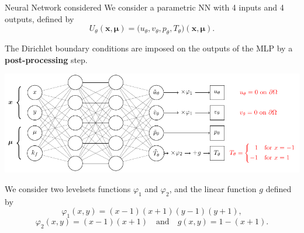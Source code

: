 \begin{frame}{Neural Network considered}
    \vspace{-2pt}
    We consider a parametric NN with 4 inputs and 4 outputs, defined by
    $$U_\theta(\bm{x},\bm{\mu}) = \big(u_\theta,v_\theta,p_\theta,T_\theta)(\bm{x},\bm{\mu}).$$
    
    The Dirichlet boundary conditions are imposed on the outputs of the MLP by a \textbf{post-processing} step. \citep{Sukumar_2022}
    
    \begin{center}
        \includegraphics[width=0.74\linewidth]{images/pinn/network/network.pdf}
    \end{center}
    We consider two levelsets functions $\varphi_1$ and $\varphi_2$, and the linear function $g$ defined by
    \begin{equation*}
        \varphi_1(x,y) = (x-1)(x+1)(y-1)(y+1),
    \end{equation*}
    \begin{equation*}
        \varphi_2(x,y) = (x-1)(x+1) \quad \text{and} \quad g(x,y) = 1 - (x+1).
    \end{equation*}
\end{frame}


